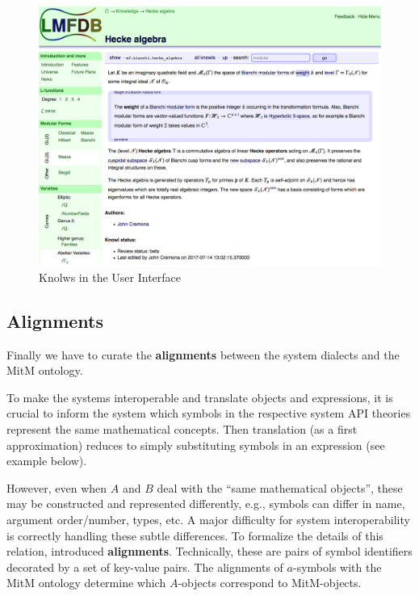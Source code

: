\begin{figure}[ht]\centering
  \includegraphics[width=14cm]{knowl}
  \caption{Knolws in the \LMFDB User Interface}\label{fig:knowl}
\end{figure}

\subsection{Alignments}\label{sec:integrating:alignments}

Finally we have to curate the \textbf{alignments} between the system dialects and the MitM ontology. 

To make the systems interoperable and translate objects and expressions, it is crucial to inform the system which symbols in the 
respective system API theories represent the same mathematical concepts. Then translation (as a first approximation) reduces to simply substituting symbols in an expression (see example below).\medskip

However, even when $A$ and $B$ deal with the ``same mathematical objects'', these may be constructed and represented differently, e.g., symbols can differ in name,
argument order/number, types, etc.
A major difficulty for system interoperability is correctly handling these subtle differences.
To formalize the details of this relation, \cite{MueGauKal:cacfms17} introduced \OMMT \textbf{alignments}.
Technically, these are pairs of \OMMT symbol identifiers decorated by a set of key-value pairs.
The alignments of $a$-symbols with the MitM ontology determine which $A$-objects correspond to MitM-objects.

